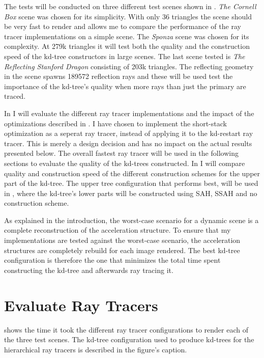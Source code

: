 The tests will be conducted on three different test scenes shown in
. \textit{The Cornell Box} scene was chosen for its
simplicity. With only 36 triangles the scene should be very fast to render and
allows me to compare the performance of the ray tracer implementations on a
simple scene. The \textit{Sponza} scene was chosen for its complexity. At 279k
triangles it will test both the quality and the construction speed of the
kd-tree constructors in large scenes. The last scene tested is \textit{The
  Reflecting Stanford Dragon} consisting of 203k triangles. The reflecting
geometry in the scene spawns 189572 reflection rays and these will be used test
the importance of the kd-tree's quality when more rays than just the primary are
traced.


In  I will evaluate the different ray tracer
implementations and the impact of the optimizations described in
. I have chosen to implement the
short-stack optimization as a seperat ray tracer, instead of applying it to the
kd-restart ray tracer. This is merely a design decision and has no impact on the
actual results presented below. The overall fastest ray tracer will be used in
the following sections to evaluate the quality of the kd-trees constructed. In
 I will compare quality and construction speed
of the different construction schemes for the upper part of the kd-tree. The
upper tree configuration that performs best, will be used in
, where the kd-tree's lower parts will be
constructed using SAH, SSAH and no construction scheme.

As explained in the introduction, the worst-case scenario for a dynamic scene is
a complete reconstruction of the acceleration structure. To ensure that my
implementations are tested against the worst-case scenario, the acceleration
structures are completely rebuild for each image rendered. The best kd-tree
configuration is therefore the one that minimizes the total time spent
constructing the kd-tree and afterwards ray tracing it.


\section{Evaluate Ray Tracers}\label{sec:evaluateRayTracer}

 shows the time it took the different ray tracer
configurations to render each of the three test scenes. The kd-tree
configuration used to produce kd-trees for the hierarchical ray tracers is
described in the figure's caption.

